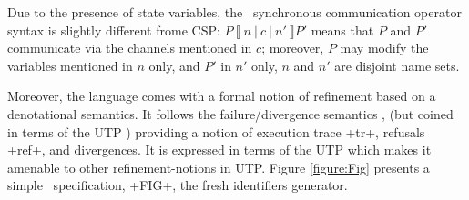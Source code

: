 \documentclass[11pt,a4paper]{article}
\begin{document}
Due to the presence of state variables, the \Circus\  synchronous communication operator 
syntax is slightly different frome CSP:  $P\ \llbracket\ n \ |\ c\ |\ n'\ \rrbracket P'$ means that 
$P$ and $P'$ communicate via the channels mentioned in $c$; moreover, $P$ may modify 
the variables mentioned in $n$ only, and $P'$ in $n'$ only, $n$ and $n'$ are disjoint name sets.

Moreover, the language comes with a formal notion of refinement based on a 
denotational semantics. It follows the failure/divergence semantics \cite{Roscoe:1997:TPC:550448}, 
(but coined in terms of the UTP \cite{CircusDS}) providing a notion of execution trace \inlineisar+tr+, 
refusals \inlineisar+ref+, and divergences. It is expressed in terms of the UTP \cite{HJ98} 
which makes it amenable to other refinement-notions in UTP. 
Figure \ref{figure:Fig} presents a simple \Circus\ specification,  \inlineisar+FIG+, 
the fresh identifiers generator.
\end{document}
